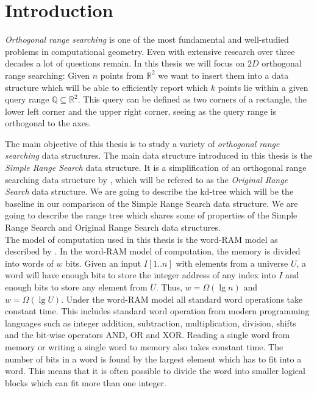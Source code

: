 \chapter{Introduction}
\label{ch:intro}

\noindent \emph{Orthogonal range searching} is one of the most fundamental and well-studied problems in computational geometry. Even with extensive research over three decades a lot of questions remain. In this thesis we will focus on $2D$ orthogonal range searching: Given $n$ points from $\mathbb{R}^2$ we want to insert them into a data structure which will be able to efficiently report which $k$ points lie within a given query range $\mathbb{Q} \subseteq \mathbb{R}^2$. This query can be defined as two corners of a rectangle, the lower left corner and the upper right corner, seeing as the query range is orthogonal to the axes.

The main objective of this thesis is to study a variety of \emph{orthogonal range searching} data structures. The main data structure introduced in this thesis is the \emph{Simple Range Search} data structure. It is a simplification of an orthogonal range searching data structure by \citet{chanetal}, which will be refered to as the \emph{Original Range Search} data structure. We are going to describe the kd-tree which will be the baseline  in our comparison of the Simple Range Search data structure. We are going to describe the range tree which shares some of properties of the Simple Range Search and Original Range Search data structures.    \\


The model of computation used in this thesis is the word-RAM model as described by \citet{wordram}. In the word-RAM model of computation, the memory is divided into words of $w$ bits. Given an input $I[1..n]$ with elements from a universe $U$, a word will have enough bits to store the integer address of any index into $I$ and enough bits to store any element from $U$. Thus, $w = \Omega(\lg n)$ and $w = \Omega(\lg U)$. Under the word-RAM model all standard word operations take constant time. This includes standard word operation from modern programming languages such as integer addition, subtraction, multiplication, division, shifts and the bit-wise operators AND, OR and XOR. Reading a single word from memory or writing a single word to memory also takes constant time. The number of bits in a word is found by the largest element which has to fit into a word. This means that it is often possible to divide the word into smaller logical blocks which can fit more than one integer.  \\


